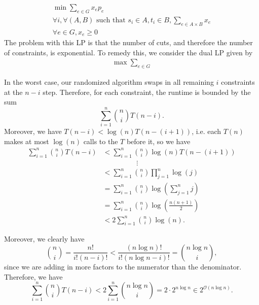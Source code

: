 \documentclass{article}
\newcommand{\problem}[1]{\noindent {\bf #1}}
\newcommand{\problempart}[1]{\noindent{\textbf{(#1)}}}
\begin{document}
\begin{align*}
\min \sum_{e \in G} x_ep_e \\
\forall i, \forall (A,B) \text{ such that } s_i \in A, t_i \in B, \sum_{e \in A \times B} x_e \\
\forall e \in G,  x_e \geq 0
\end{align*}
The problem with this LP is that the number of cuts, and therefore the number of constraints, is exponential. To remedy this, we consider the dual LP given by
\begin{align*}
\max \sum_{e \in G} 
\end{align*}
\problem{Problem 3.}

\problempart{a} 

\problempart{b} In the worst case, our randomized algorithm swaps in all remaining $i$ constraints at the $n-i$ step. Therefore, for each constraint, the runtime is bounded by the sum
\[\sum_{i=1}^n \binom{n}{i} T(n-i).\]
Moreover, we have $T(n-i)<\log(n)T(n-(i+1))$, i.e. each $T(n)$ makes at most $\log(n)$ calls to the $T$ before it, so we have
\begin{align*}\sum_{i=1}^n \binom{n}{i} T(n-i)&<\sum_{i=1}^n \binom{n}{i}\log(n) T(n-(i+1))\\
&\hspace{2cm}\vdots\\
&<\sum_{i=1}^n \binom{n}{i} \prod_{j=1}^n \log(j)\\
&=\sum_{i=1}^n \binom{n}{i} \log\left(\sum_{j=1}^{n} j\right)\\
&=\sum_{i=1}^n \binom{n}{i} \log\left(\frac{n(n+1)}{2}\right)\\
&<2\sum_{i=1}^n \binom{n}{i} \log(n).\end{align*}

Moreover, we clearly have
\[\binom{n}{i}=\frac{n!}{i!(n-i)!}<\frac{(n\log n)!}{i!(n\log n - i)!} = \binom{n\log n}{i},\]
since we are adding in more factors to the numerator than the denominator. Therefore, we have
\[\sum_{i=1}^n \binom{n}{i} T(n-i) < 2\sum_{i=1}^n \binom{n\log n}{i} = 2\cdot 2^{n\log n} \in 2^{\mathcal{O}(n\log n)}.\]
\end{document}
